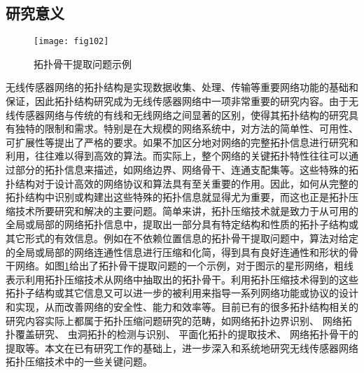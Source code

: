 \subsection{研究意义}
\begin{figure}[t]
  \centering
  \texttt{[image: fig102]}
  \caption{拓扑骨干提取问题示例}
  \label{fig:102}
\end{figure}
无线传感器网络的拓扑结构是实现数据收集、处理、传输等重要网络功能的基础和保证，因此拓扑结构研究成为无线传感器网络中一项非常重要的研究内容。由于无线传感器网络与传统的有线和无线网络之间显著的区别，使得其拓扑结构的研究具有独特的限制和需求。特别是在大规模的网络系统中，对方法的简单性、可用性、可扩展性等提出了严格的要求。如果不加区分地对网络的完整拓扑信息进行研究和利用，往往难以得到高效的算法。而实际上，整个网络的关键拓扑特性往往可以通过部分的拓扑信息来描述，如网络边界、网络骨干、连通支配集等。这些特殊的拓扑结构对于设计高效的网络协议和算法具有至关重要的作用。因此，如何从完整的拓扑结构中识别或构建出这些特殊的拓扑信息就显得尤为重要，而这也正是拓扑压缩技术所要研究和解决的主要问题。简单来讲，拓扑压缩技术就是致力于从可用的全局或局部的网络拓扑信息中，提取出一部分具有特定结构和性质的拓扑子结构或其它形式的有效信息。例如在不依赖位置信息的拓扑骨干提取问题中，算法对给定的全局或局部的网络连通性信息进行压缩和化简，得到具有良好连通性和形状的骨干网络。如图\ref{fig:102}给出了拓扑骨干提取问题的一个示例，对于图示的星形网络，粗线表示利用拓扑压缩技术从网络中抽取出的拓扑骨干。利用拓扑压缩技术得到的这些拓扑子结构或其它信息又可以进一步的被利用来指导一系列网络功能或协议的设计和实现，从而改善网络的安全性、能力和效率等。目前已有的很多拓扑结构相关的研究内容实际上都属于拓扑压缩问题研究的范畴，如网络拓扑边界识别、 网络拓扑覆盖研究、 虫洞拓扑的检测与识别、
平面化拓扑的提取技术、 网络拓扑骨干的提取等。本文在已有研究工作的基础上，进一步深入和系统地研究无线传感器网络拓扑压缩技术中的一些关键问题。


